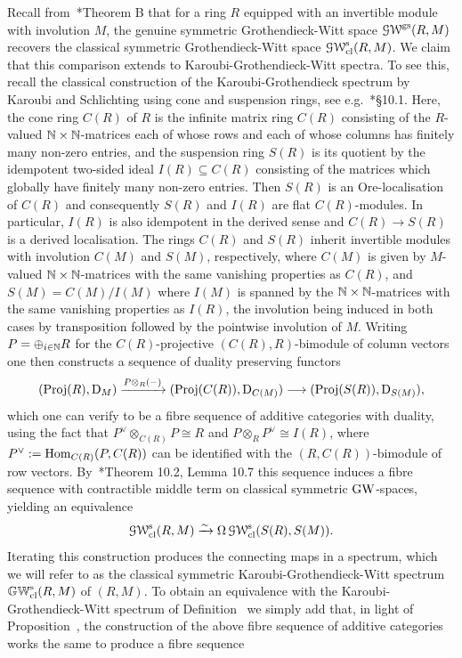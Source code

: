 \begin{remark}
Recall from~\cite{comparison}*{Theorem B} that for a ring $R$ equipped with an invertible module with involution $M$, the genuine symmetric Grothendieck-Witt space $\operatorname{\mathcal{GW}}^{\mathrm{gs}}(R,M)$ recovers the classical symmetric Grothendieck-Witt space $\operatorname{\mathcal{GW}}_{\mathrm{cl}}^{\mathrm{s}}(R,M)$. 
We claim that this comparison extends to Karoubi-Grothendieck-Witt spectra. To see this, recall the classical construction of the Karoubi-Grothendieck spectrum by Karoubi and Schlichting using cone and suspension rings, see e.g.\ \cite{schlichting-mv}*{\S 10.1}.
Here, the cone ring $C(R)$ of $R$ is the infinite matrix ring $C(R)$ consisting of the $R$-valued $\mathbb{N}\times \mathbb{N}$-matrices each of whose rows and each of whose columns has finitely many non-zero entries, and the suspension ring $S(R)$ is its quotient by the idempotent two-sided ideal $I(R) \subseteq C(R)$ consisting of the matrices which globally have finitely many non-zero entries. Then $S(R)$ is an Ore-localisation of $C(R)$ and consequently $S(R)$ and $I(R)$ are flat $C(R)$-modules. In particular, $I(R)$ is also idempotent in the derived sense and $C(R) \to S(R)$ is a derived localisation.
The rings $C(R)$ and $S(R)$ inherit invertible modules with involution $C(M)$ and $S(M)$, respectively, where $C(M)$ is given by $M$-valued $\mathbb{N}\times\mathbb{N}$-matrices with the same vanishing properties as $C(R)$, and $S(M) = C(M)/I(M)$ where $I(M)$ is spanned by the $\mathbb{N}\times \mathbb{N}$-matrices with the same vanishing properties as $I(R)$, the involution being induced in both cases by transposition followed by the pointwise involution of $M$.
Writing $P = \oplus_{i \in \mathbb{N}} R$ for the $C(R)$-projective $(C(R),R)$-bimodule of column vectors one then constructs a sequence of duality preserving functors
\[
(\mathrm{Proj}(R),\mathrm{D}_M) \xrightarrow{P\otimes_R (-)} (\mathrm{Proj}(C(R)),\mathrm{D}_{C(M)}) \longrightarrow (\mathrm{Proj}(S(R)),\mathrm{D}_{S(M)}) ,
\]
which one can verify to be a fibre sequence of additive categories with duality, using the fact that $P^{\vee}\otimes_{C(R)} P \cong R$ and $P\otimes_R P^{\vee} \cong I(R)$, where $P^{\vee} := \operatorname{Hom}_{C(R)}(P,C(R))$ can be identified with the $(R,C(R))$-bimodule of row vectors. By~\cite{schlichting-mv}*{Theorem 10.2, Lemma 10.7} this sequence induces a fibre sequence with contractible middle term on classical symmetric $\operatorname{GW}$-spaces, yielding an equivalence 
\[
\operatorname{\mathcal{GW}}_{\mathrm{cl}}^{\mathrm{s}}(R,M) \xrightarrow{\sim} \Omega\operatorname{\mathcal{GW}}_{\mathrm{cl}}^{\mathrm{s}}(S(R),S(M)).
\]
Iterating this construction produces the connecting maps in a spectrum, which we will refer to as the classical symmetric Karoubi-Grothendieck-Witt spectrum $\mathbb{GW}_{\mathrm{cl}}^{\mathrm{s}}(R,M)$ of $(R,M)$. To obtain an equivalence with the Karoubi-Grothendieck-Witt spectrum of Definition~ we simply add that, in light of Proposition~, the construction of the above fibre sequence of additive categories works the same to produce a fibre sequence

\end{remark}
